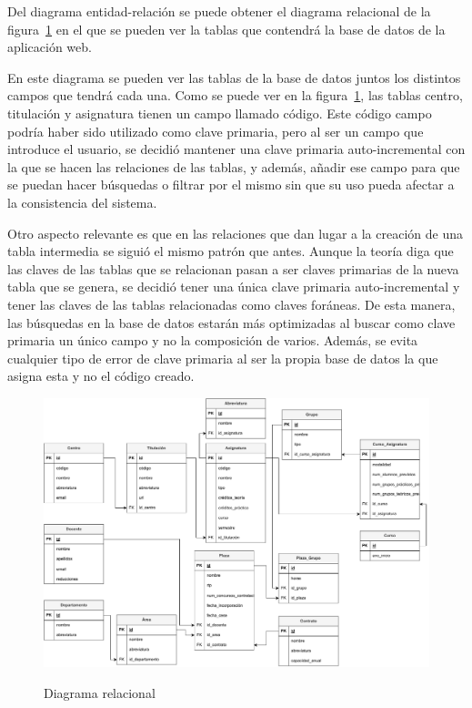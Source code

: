 Del diagrama entidad-relación se puede obtener el diagrama relacional de la figura~\ref{DiagramaRelacional} en el que se pueden ver la tablas que contendrá la base de datos de la aplicación web.

En este diagrama se pueden ver las tablas de la base de datos juntos los distintos campos que tendrá cada una.
Como se puede ver en la figura~\ref{DiagramaRelacional}, las tablas centro, titulación y asignatura tienen un campo llamado código. 
Este código campo podría haber sido utilizado como clave primaria, pero al ser un campo que introduce el usuario, se decidió mantener una clave primaria auto-incremental con la que se hacen las relaciones de las tablas, y además, añadir ese campo para que se puedan hacer búsquedas o filtrar por el mismo sin que su uso pueda afectar a la consistencia del sistema.

Otro aspecto relevante es que en las relaciones que dan lugar a la creación de una tabla intermedia se siguió el mismo patrón que antes. 
Aunque la teoría diga que las claves de las tablas que se relacionan pasan a ser claves primarias de la nueva tabla que se genera, se decidió tener una única clave primaria auto-incremental y tener las claves de las tablas relacionadas como claves foráneas.
De esta manera, las búsquedas en la base de datos estarán más optimizadas al buscar como clave primaria un único campo y no la composición de varios.
Además, se evita cualquier tipo de error de clave primaria al ser la propia base de datos la que asigna esta y no el código creado.

\begin{landscape}
	\begin{figure}[h]
		\caption[DiagramaRelacional]{Diagrama relacional}
		\centering
		\includegraphics[scale=0.7]{../img/Anexos/Diagrama relacional.pdf}
		\label{DiagramaRelacional}
	\end{figure}
\end{landscape}

